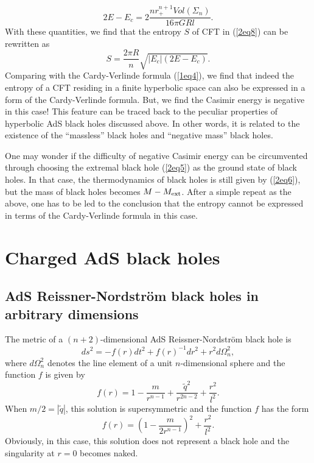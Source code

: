 \documentclass[a4paper,12pt]{article}
\newcommand{\sect}[1]{\setcounter{equation}{0}\section{#1}}
\begin{document}
\begin{equation}
\label{2eq11}
2E-E_c =2\frac{n r_+^{n+1} Vol(\Sigma_n)}{16\pi GR l}.   
\end{equation}
With these quantities, we find that the entropy $S$ of CFT in (\ref{2eq8}) 
can be rewritten as
\begin{equation}
\label{2eq12}
S =\frac{2\pi R}{n}\sqrt{|E_c|(2E-E_c)}.
\end{equation}
Comparing with the Cardy-Verlinde formula (\ref{1eq4}), we find that indeed
the entropy of a CFT residing in a finite hyperbolic space can also be 
expressed in a form of the Cardy-Verlinde formula. But,
we find the Casimir energy is negative in this case! This feature can be 
traced back to the peculiar properties of hyperbolic AdS black holes 
discussed above. In other words, it is related to the existence of the
 ``massless'' black holes and ``negative mass'' black holes.    

   
One may wonder if the difficulty of negative Casimir energy can be 
circumvented through choosing the extremal black hole (\ref{2eq5}) as
the ground state of black holes. In that case, the thermodynamics of black 
holes is still given by (\ref{2eq6}), but the mass of black holes becomes
$M-M_{\rm ext}$. After a simple repeat as the above, one has to be led to 
the conclusion that the entropy cannot be expressed in terms of the 
Cardy-Verlinde formula in this case.  



\sect{Charged AdS black holes }



\subsection{AdS Reissner-Nordstr\"om black holes in arbitrary dimensions}

The metric of a $(n+2)$-dimensional AdS Reissner-Nordstr\"om black hole
is \cite{CS,Cham}
\begin{equation}
\label{3eq1}
ds^2= -f(r)dt^2 +f(r)^{-1}dr^2 +r^2 d\Omega_n^2,
\end{equation}
where $d\Omega_n^2$ denotes the line element of a unit $n$-dimensional 
sphere and the function $f$ is given by
\begin{equation}
\label{3eq2}
f(r)= 1-\frac{m}{r^{n-1}} +\frac{\tilde q^2}{r^{2n-2}} +\frac{r^2}{l^2}. 
\end{equation}
When $m/2 =|\tilde q| $, this solution is supersymmetric and the function $f$ 
has the form 
\begin{equation}
\label{req3}
f(r)= \left( 1-\frac{m}{2r^{n-1}}\right)^2 +\frac{r^2}{l^2}.
\end{equation}
Obviously, in this case, this solution does not represent a black hole and the
singularity at $r=0$ becomes naked. 
\end{document}
